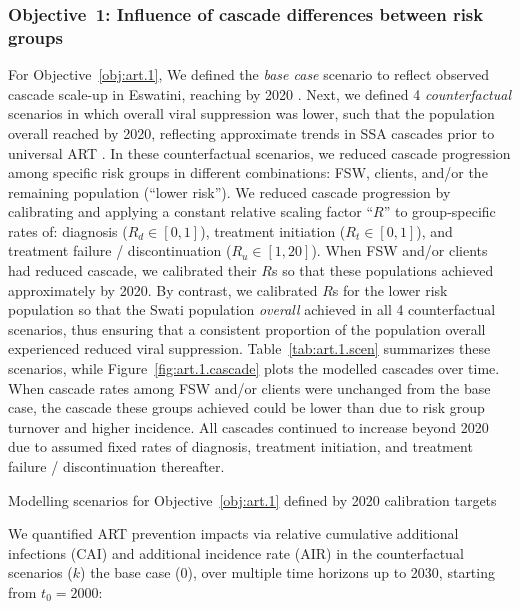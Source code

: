 \subsubsection{Objective~1: Influence of cascade differences between risk groups}\label{art.meth.obj.1}
For Objective~\ref{obj:art.1},
We defined the \emph{base case} scenario to reflect
observed cascade scale-up in Eswatini, reaching \cashi by 2020 \cite{SHIMS3,AIDSinfo}.
Next, we defined 4 \emph{counterfactual} scenarios in which overall viral suppression was lower,
such that the population overall reached \casmd by 2020,
reflecting approximate trends in SSA cascades prior to universal ART \cite{AIDSinfo}.
In these counterfactual scenarios, we reduced cascade progression
among specific risk groups in different combinations:
FSW, clients, and/or the remaining population (``lower risk'').
We reduced cascade progression by calibrating and applying
a constant relative scaling factor ``$R$'' to group-specific rates of:
diagnosis ($R_d \in [0,1]$),
treatment initiation ($R_t \in [0,1]$), and
treatment failure / discontinuation ($R_u \in [1,20]$).
When FSW and/or clients had reduced cascade, we calibrated their $R$s so that
these populations achieved approximately \caslo by 2020.
By contrast, we calibrated $R$s for the lower risk population so that
the Swati population \emph{overall} achieved \casmd in all 4 counterfactual scenarios,
thus ensuring that a consistent proportion of the population overall
experienced reduced viral suppression.
Table~\ref{tab:art.1.scen} summarizes these scenarios, while
Figure~\ref{fig:art.1.cascade} plots the modelled cascades over time.
When cascade rates among FSW and/or clients were unchanged from the base case,
the cascade these groups achieved could be lower than \cashi
due to risk group turnover and higher incidence.
All cascades continued to increase beyond 2020 due to assumed fixed rates of
diagnosis, treatment initiation, and treatment failure / discontinuation thereafter.
\begin{table}
  \centering
  \caption{Modelling scenarios for Objective~\ref{obj:art.1} defined by 2020 calibration targets}
  \label{tab:art.1.scen}
  
\end{table}
\par
We quantified ART prevention impacts via relative
cumulative additional infections (CAI) and additional incidence rate (AIR)
in the counterfactual scenarios ($k$) \vs the base case ($0$),
over multiple time horizons up to 2030, starting from $t_0 = 2000$:
